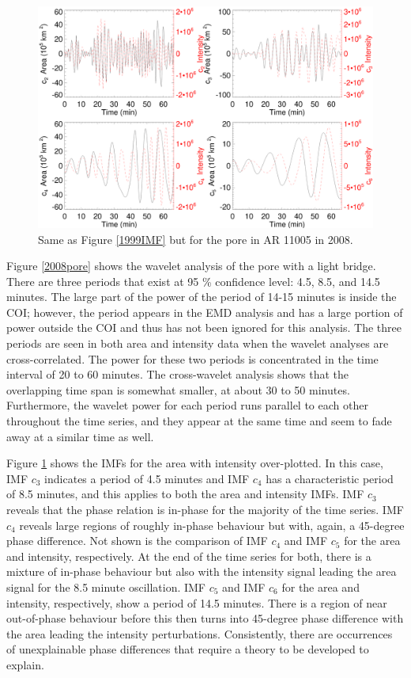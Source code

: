      \begin{figure}
     \centering
     \includegraphics[width=\textwidth]{2008_IMFs.eps}
     \caption{
       			Same as Figure \ref{1999IMF} but for the pore in AR 11005 in 2008.
        		  }
     \label{20008IMF}
     \end{figure}
      
	Figure \ref{2008pore} shows the wavelet analysis of the pore with a light bridge.
	There are three periods that exist at 95 \% confidence level: 4.5, 8.5, and 14.5 minutes.
	The large part of the power of the period of 14-15 minutes is inside the COI; however, the period appears in the EMD analysis and has a large portion of power outside the COI and thus has not been ignored for this analysis.
	The three periods are seen in both area and intensity data when the wavelet analyses are cross-correlated.
	The power for these two periods is concentrated in the time interval of 20 to 60 minutes.
	The cross-wavelet analysis shows that the overlapping time span is somewhat smaller, at about 30 to 50 minutes.
	Furthermore, the wavelet power for each period runs parallel to each other throughout the time series, and they appear at the same time and seem to fade away at a similar time as well.
	
	Figure \ref{20008IMF} shows the IMFs for the area with intensity over-plotted.
	In this case, IMF $c_{3}$ indicates a period of 4.5 minutes and IMF $c_{4}$ has a characteristic period of 8.5 minutes, and this applies to both the area and intensity IMFs.
	IMF $c_{3}$ reveals that the phase relation is in-phase for the majority of the time series.
	IMF $c_{4}$ reveals large regions of roughly in-phase behaviour but with, again, a 45-degree phase difference.
	Not shown is the comparison of IMF $c_{4}$ and IMF $c_{5}$ for the area and intensity, respectively.
	At the end of the time series for both, there is a mixture of in-phase behaviour but also with the intensity signal leading the area signal for the 8.5 minute oscillation.
	IMF $c_{5}$ and IMF $c_{6}$ for the area and intensity, respectively, show a period of 14.5 minutes.
	There is a region of near out-of-phase behaviour before this then turns into 45-degree phase difference with the area leading the intensity perturbations.
	Consistently, there are occurrences of unexplainable phase differences that require a theory to be developed to explain.
       
